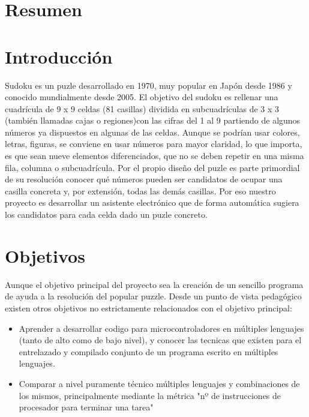 \documentclass[12pt,letterpaper]{article}
\begin{document}
\section{Resumen}




\section{Introducción}

Sudoku es un puzle desarrollado en 1970, muy popular en Japón
desde 1986 y conocido mundialmente desde 2005.
El objetivo del sudoku es rellenar una cuadrícula de 9 x 9 celdas
(81 casillas) dividida en subcuadrículas de 3 x 3 (también llamadas
cajas o regiones)con las cifras del 1 al 9 partiendo de algunos
números ya dispuestos en algunas de las celdas. Aunque se podrían usar
colores, letras, figuras, se conviene en usar números para mayor
claridad, lo que importa, es que sean nueve elementos diferenciados,
que no se deben repetir en una misma fila, columna o subcuadrícula.
Por el propio diseño del puzle es parte primordial de su resolución 
conocer qué números pueden ser candidatos de ocupar una casilla concreta
y, por extensión, todas las demás casillas.
Por eso nuestro proyecto es desarrollar un asistente electrónico que
de forma automática sugiera los candidatos para cada celda dado
un puzle concreto.





\section{Objetivos}

Aunque el objetivo principal del proyecto sea la creación de un sencillo
programa de ayuda a la resolución del popular puzzle. Desde un punto de 
vista pedagógico existen otros objetivos no estrictamente relacionados
con el objetivo principal:

\begin{itemize}
\item Aprender a desarrollar codigo para microcontroladores en
múltiples lenguajes (tanto de alto como de bajo nivel), y
conocer las tecnicas que existen para el entrelazado y compilado
conjunto de un programa escrito en múltiples lenguajes.
\item Comparar a nivel puramente técnico múltiples lenguajes y
combinaciones de los mismos, principalmente mediante la métrica
"nº de instrucciones de procesador para terminar una tarea"
\end{itemize}
\end{document}
